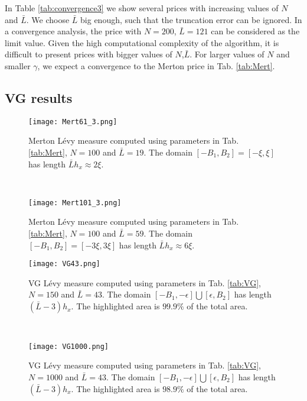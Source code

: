 In Table \ref{tab:convergence3} we show several prices with increasing values of $N$ and $\bar L$. We choose $\bar L$ big enough, such that the truncation error can be ignored.
In a convergence analysis, the price with $N=200$, $\bar L = 121$ can be considered as the limit value. Given the high computational complexity of the algorithm, 
it is difficult to present prices with bigger values of $N$,$\bar L$.
For larger values of $N$ and smaller $\gamma$, we expect a convergence to the Merton price in Tab. \ref{tab:Mert}. 

\subsection{VG results}\label{num_sec_VG}

\begin{figure}[t!]
 \begin{minipage}[b]{0.5\linewidth}
   \centering
   \texttt{[image: Mert61\_3.png]}
   \caption{Merton L\'evy measure computed using parameters in Tab. \ref{tab:Mert}, $N=100$ and $\bar L=19$. 
   The domain $[-B_1,B_2] = [-\xi,\xi]$ has length $\bar L h_x \approx 2 \xi$.}
   \label{Fig13} 
 \end{minipage}
 \ \hspace{2mm} \hspace{3mm} \
 \begin{minipage}[b]{0.5\linewidth}
  \centering
   \texttt{[image: Mert101\_3.png]}
   \caption{Merton L\'evy measure computed using parameters in Tab. \ref{tab:Mert}, $N=100$ and $\bar L=59$. 
   The domain $[-B_1,B_2] = [-3\xi,3\xi]$ has length $\bar L h_x \approx 6 \xi$.}
   \label{Fig14}
 \end{minipage}
\end{figure}
\begin{figure}[t!]
 \begin{minipage}[b]{0.5\linewidth}
   \centering
   \texttt{[image: VG43.png]}
   \caption{VG L\'evy measure computed using parameters in Tab. \ref{tab:VG}, $N=150$ and $\bar L=43$. 
   The domain $[-B_1,-\epsilon]\bigcup [\epsilon,B_2]$ has length $(\bar L-3) h_x$. The highlighted area is $99.9\%$ of the total area.}
   \label{Fig15} 
 \end{minipage}
 \ \hspace{2mm} \hspace{3mm} \
 \begin{minipage}[b]{0.5\linewidth}
  \centering
   \texttt{[image: VG1000.png]}
   \caption{VG L\'evy measure computed using parameters in Tab. \ref{tab:VG}, $N=1000$ and $\bar L=43$. 
   The domain $[-B_1,-\epsilon]\bigcup [\epsilon,B_2]$ has length $(\bar L-3) h_x$. The highlighted area is $98.9\%$ of the total area.}
   \label{Fig16}
 \end{minipage}
\end{figure}

